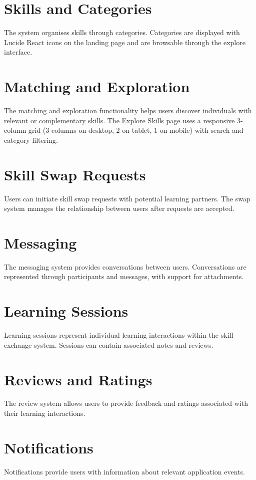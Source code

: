 \documentclass[12pt,a4paper]{report}
\begin{document}
\section{Skills and Categories}
The system organises skills through categories.  Categories are displayed with
Lucide React icons on the landing page and are browsable through the explore
interface.

\section{Matching and Exploration}
The matching and exploration functionality helps users discover individuals with
relevant or complementary skills.  The Explore Skills page uses a responsive
3-column grid (3 columns on desktop, 2 on tablet, 1 on mobile) with search and
category filtering.

\section{Skill Swap Requests}
Users can initiate skill swap requests with potential learning partners.  The
swap system manages the relationship between users after requests are accepted.

\section{Messaging}
The messaging system provides conversations between users.  Conversations are
represented through participants and messages, with support for attachments.

\section{Learning Sessions}
Learning sessions represent individual learning interactions within the skill
exchange system.  Sessions can contain associated notes and reviews.

\section{Reviews and Ratings}
The review system allows users to provide feedback and ratings associated with
their learning interactions.

\section{Notifications}
Notifications provide users with information about relevant application events.
\end{document}
